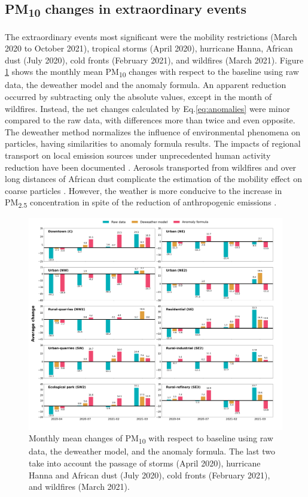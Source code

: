 \documentclass[sn-mathphys-num]{sn-jnl}
\begin{document}
\subsection{PM\textsubscript{10} changes in extraordinary events}
The extraordinary events most significant were the mobility restrictions (March 2020 to October 2021), tropical storms (April 2020), hurricane Hanna, African dust (July 2020), cold fronts (February 2021), and wildfires (March 2021). Figure \ref{fig:average_change_deweather_fourier} shows the monthly mean PM\textsubscript{10} changes with respect to the baseline using raw data, the deweather model and the anomaly formula. An apparent reduction occurred by subtracting only the absolute values, except in the month of wildfires. Instead, the net changes calculated by Eq.\ref{eq:anomalies} were minor compared to the raw data, with differences more than twice and even opposite. The deweather method normalizes the influence of environmental phenomena on particles, having similarities to anomaly formula results. The impacts of regional transport on local emission sources under unprecedented human activity reduction have been documented \citep{Shen_2021}. Aerosols transported from wildfires and over long distances of African dust complicate the estimation of the mobility effect on coarse particles \citep{Conte_2023}. However, the weather is more conducive to the increase in PM\textsubscript{2.5} concentration in spite of the reduction of anthropogenic emissions \citep{Liu_2022}.
\begin{figure}[ht!]
	\centering
	\includegraphics[width=\linewidth]{figures/average_change_deweather_fourier.png}
	\caption{Monthly mean changes of PM\textsubscript{10} with respect to baseline using raw data, the deweather model, and the anomaly formula. The last two take into account the passage of storms (April 2020), hurricane Hanna and African dust (July 2020), cold fronts (February 2021), and wildfires (March 2021).
	}
	\label{fig:average_change_deweather_fourier}
\end{figure}
\end{document}
